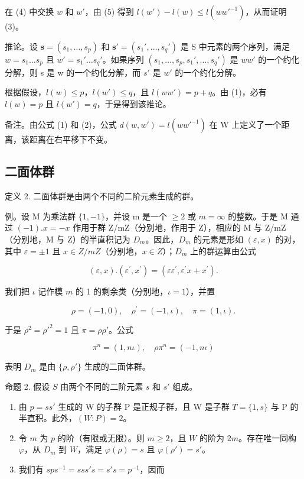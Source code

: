 在 (4) 中交换 \(w\) 和 \(w'\)，由 (5) 得到 \(l(w') - l(w) \leqslant l(ww'^{-1})\)，从而证明 (3)。

推论。设 \(\mathbf{s} = (s_{1}, \ldots, s_{p})\) 和 \(\mathbf{s}' = (s_{1}', \ldots, s_{q}')\) 是 S 中元素的两个序列，满足 \(w = s_{1} \ldots s_{p}\) 且 \(w' = s_{1}' \ldots s_{q}'\)。如果序列 \((s_{1}, \ldots, s_{p}, s_{1}', \ldots, s_{q}')\) 是 \(ww'\) 的一个约化分解，则 s 是 w 的一个约化分解，而 \(s'\) 是 \(w'\) 的一个约化分解。

根据假设，\(l(w) \leqslant p\)，\(l(w') \leqslant q\)，且 \(l(ww') = p + q\)。由 (1)，必有 \(l(w) = p\) 且 \(l(w') = q\)，于是得到该推论。

备注。由公式 (1) 和 (2)，公式 \(d(w, w') = l(ww'^{-1})\) 在 W 上定义了一个距离，该距离在右平移下不变。

\subsection{二面体群}

定义 2. 二面体群是由两个不同的二阶元素生成的群。

例。设 M 为乘法群 \(\{1,-1\}\)，并设 m 是一个 \(\geqslant2\) 或 \(m=\infty\) 的整数。于是 M 通过 \((-1).x=-x\) 作用于群 Z/mZ（分别地，作用于 Z），相应的 M 与 Z/mZ（分别地，M 与 Z）的半直积记为 \(D_{m}\)。因此，\(D_{m}\) 的元素是形如 \((\varepsilon,x)\) 的对，其中 \(\varepsilon=\pm1\) 且 \(x\in Z/mZ\)（分别地，\(x\in Z\)）；\(D_{m}\) 上的群运算由公式

\[
(\varepsilon , x). (\varepsilon^ {\prime}, x ^ {\prime}) = (\varepsilon \varepsilon^ {\prime}, \varepsilon^ {\prime} x + x ^ {\prime}).\tag{6}
\]

我们把 \(\iota\) 记作模 \(m\) 的 1 的剩余类（分别地，\(\iota = 1\)），并置

\[
\rho = (- 1, 0), \quad \rho^ {\prime} = (- 1, \iota), \quad \pi = (1, \iota).\tag{7}
\]

于是 \(\rho^2 = \rho'^2 = 1\) 且 \(\pi = \rho \rho'\)。公式

\[
\pi^ {n} = (1, n \iota), \quad \rho \pi^ {n} = (- 1, n \iota)\tag{8}
\]

表明 \(D_{m}\) 是由 \(\{\rho,\rho'\}\) 生成的二面体群。

命题 2. 假设 \(S\) 由两个不同的二阶元素 \(s\) 和 \(s'\) 组成。

\begin{enumerate}
\def\labelenumi{(\roman{enumi})}
\item
  由 \(p = ss'\) 生成的 W 的子群 P 是正规子群，且 W 是子群 \(T = \{1, s\}\) 与 P 的半直积。此外，\((W : P) = 2\)。
\item
  令 \(m\) 为 \(p\) 的阶（有限或无限）。则 \(m \geqslant 2\)，且 \(W\) 的阶为 \(2m\)。存在唯一同构 \(\varphi\)，从 \(D_m\) 到 \(W\)，满足 \(\varphi(\rho) = s\) 且 \(\varphi(\rho') = s'\)。
\item
  我们有 \(sps^{-1} = sss's = s's = p^{-1}\)，因而
\end{enumerate}

